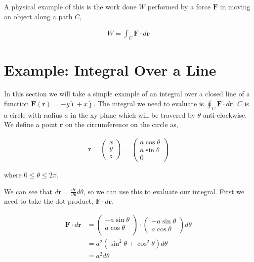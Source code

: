 \documentclass[11pt]{amsart}
\begin{document}
A physical example of this is the work done $W$ performed by a force $\mathbf{F}$ in moving an object along a path $C$,

\begin{align*}
  W = \int_C \mathbf{F} \cdot d\mathbf{r}
\end{align*}

\section{Example: Integral Over a Line}

In this section we will take a simple example of an integral over a closed line of a function $\mathbf{F}(\mathbf{r}) = -y\hat{\imath} + x\hat{\jmath}$. The integral we need to evaluate is $\oint_C \mathbf{F} \cdot d\mathbf{r}$. $C$ is a circle with radius $a$ in the xy plane which will be travered by $\theta$ anti-clockwise. We define a point $\mathbf{r}$ on the circumference on the circle as,

\begin{align*}
  \mathbf{r} =
    \begin{pmatrix}
      x \\
      y \\
      z
    \end{pmatrix} =
    \begin{pmatrix}
      a \cos{\theta} \\
      a \sin{\theta} \\
      0
    \end{pmatrix}
\end{align*}

where $0 \leq \theta \leq 2\pi$.

We can see that $d\mathbf{r} = \frac{d\mathbf{r}}{d \theta} d\theta$, so we can use this to evaluate our integral. First we need to take the dot product, $\mathbf{F} \cdot d\mathbf{r}$,

\begin{align*}
  \mathbf{F} \cdot d\mathbf{r} &=
  \begin{pmatrix}
    -a \sin{\theta} \\
    a \cos{\theta} \\
  \end{pmatrix} \cdot
  \begin{pmatrix}
    -a \sin{\theta} \\
    a \cos{\theta}
  \end{pmatrix} d\theta \\
  &= a^2 \left(\sin^2{\theta} + \cos^2{\theta}\right)d\theta \\
  &= a^2 d\theta
\end{align*}
\end{document}
